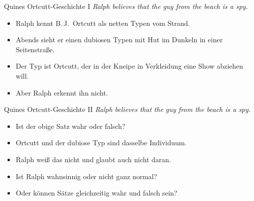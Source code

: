 \begin{frame}
  {Quines Ortcutt-Geschichte I}
  \onslide<+->
  \onslide<+->
  \alert{\textit{Ralph believes that the guy from the beach is a spy.}}\\
  \Halbzeile
  \begin{itemize}[<+->]
    \item Ralph kennt B.\,J.\ Ortcutt als netten Typen vom Strand.
    \item Abends sieht er einen dubiosen Typen mit Hut im Dunkeln in einer Seitenstraße.
    \item Der Typ ist Ortcutt, der in der Kneipe in Verkleidung eine Show abziehen will.
    \item Aber Ralph erkennt ihn nicht.
  \end{itemize}
\end{frame}

\begin{frame}
  {Quines Ortcutt-Geschichte II}
  \onslide<+->
  \onslide<+->
  \alert{\textit{Ralph believes that the guy from the beach is a spy.}}\\
  \Halbzeile
  \begin{itemize}[<+->]
    \item Ist der obige Satz wahr oder falsch?
    \item {} Ortcutt und der dubiose Typ sind dasselbe Individuum.
    \item {} Ralph weiß das nicht und glaubt auch nicht daran.
      \Halbzeile
    \item Ist Ralph wahnsinnig oder nicht ganz normal?
    \item Oder können Sätze gleichzeitig wahr und falsch sein?
  \end{itemize}
\end{frame}

